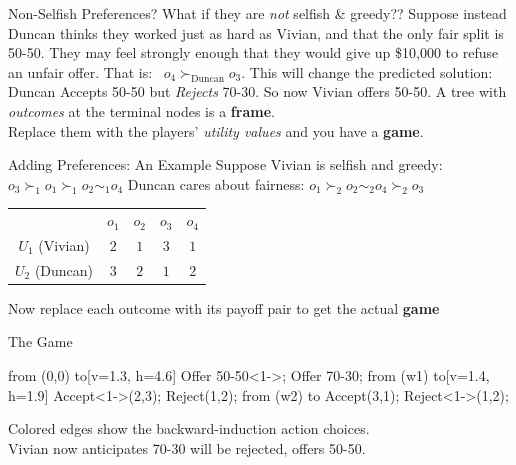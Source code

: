 \begin{frame}{Non-Selfish Preferences?}
What if they are \textit{not} selfish \& greedy??
\bsk
Suppose instead Duncan thinks they worked just as hard as Vivian, and that the only fair split is 50-50. They may feel strongly enough that they would give up \$10,000 to refuse an unfair offer.
\bsk
That is: \ $o_4\succ_{\text{Duncan}} o_3$.
\vfill
This will change the predicted solution:\\
Duncan Accepts 50-50 but \textit{Rejects} 70-30. So now Vivian offers 50-50.
\bsk
\centering
\large
A tree with \textit{outcomes} at the terminal nodes is a \textbf{frame}.\\
\bsk
Replace them with the players' \textit{utility values} and you have a \textbf{game}.
\vfill
\end{frame}

\begin{frame}{Adding Preferences: An Example}
Suppose Vivian is selfish and greedy: \hspace{0.35in} $o_3\succ_1 o_1\succ_1 o_2\sim_1 o_4$
\bsk
Duncan cares about fairness: \hspace{0.2in} $o_1\succ_2 o_2\sim_2 o_4\succ_2 o_3$
\bsk
\centering
\begin{tabular}{c|c|c|c|c|}
\cline{2-5}
& $o_1$ & $o_2$ & $o_3$ & $o_4$ \\
\cline{2-5}
$U_1$ (Vivian) & $2$ & $1$ & $3$ & $1$ \\
\cline{2-5}
$U_2$ (Duncan) & $3$ & $2$ & $1$ & $2$ \\
\cline{2-5}
\end{tabular}

\bsk
\raggedright
\vfill
Now replace each outcome with its payoff pair to get the actual \textbf{game}
\vspace{-0.3in}
\end{frame}

\begin{frame}{The Game}
\centering
\begin{gametree}[player names={Vivian, Duncan}, scale=0.9]
  \branch[player=1, root=w, label=90] from (0,0) to[v=1.3, h=4.6]
    {Offer 50-50<1->; Offer 70-30};
  \branch[player=2, label=135] from (w1) to[v=1.4, h=1.9]
    {Accept<1->(2,3); Reject(1,2)};
  \branch[label=45] from (w2) to {Accept(3,1); Reject<1->(1,2)};
\end{gametree}
\bsk
\raggedright
Colored edges show the backward-induction action choices.\\
Vivian now anticipates 70-30 will be rejected, offers 50-50.
\vspace{-0.2in}
\end{frame}

